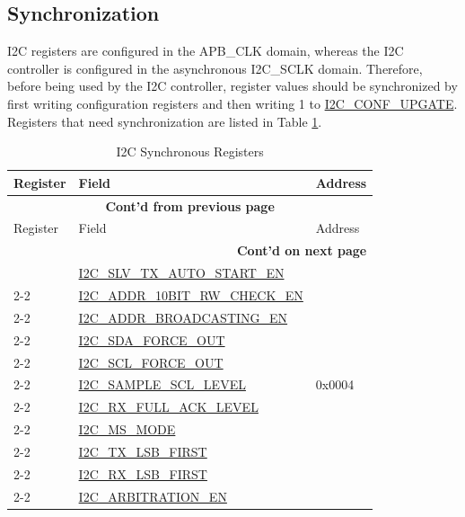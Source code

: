 \documentclass[main\_\_EN.tex]{subfiles}
\begin{document}
\subsection{Synchronization}
I2C registers are configured in the APB\_CLK domain, whereas the I2C controller is configured in the asynchronous I2C\_SCLK domain. Therefore, before being used by the I2C controller, register values should be synchronized by first writing configuration registers and then writing 1 to \hyperref[fielddesc:I2CCONFUPGATE]{I2C\_CONF\_UPGATE}. Registers that need synchronization are listed in Table \ref{tab:i2c-sync-register}. 

\newpage
\begin{longtable}{ | p{6cm} | p{7cm} | p{2cm} | }
\caption{I2C Synchronous Registers}
\label{tab:i2c-sync-register}
\\\hline
\rowcolor{lightgray}
\textbf{Register} & \textbf{Field} & \textbf{Address}  \\ \hline
\endfirsthead
    
\multicolumn{3}{c}{\bfseries Cont'd from previous page}\\\hline
\rowcolor{lightgray}
Register & Field & Address  \\ \hline
\endhead

\multicolumn{3}{r}{\textbf{Cont'd on next page}} \\\hline
\endfoot
    
\endlastfoot

\multirow{11}{*}{\hyperref[regdesc:I2CCTRREG]{I2C\_CTR\_REG}} & {\hyperref[fielddesc:I2CSLVTXAUTOSTARTEN]{I2C\_SLV\_TX\_AUTO\_START\_EN}} & \multirow{11}{*}{0x0004}   \\\cline{2-2}

& {\hyperref[fielddesc:I2CADDR10BITRWCHECKEN]{I2C\_ADDR\_10BIT\_RW\_CHECK\_EN}}& \\\cline{2-2}
& {\hyperref[fielddesc:I2CADDRBROADCASTINGEN]{I2C\_ADDR\_BROADCASTING\_EN}}& \\\cline{2-2}
& {\hyperref[fielddesc:I2CSDAFORCEOUT]{I2C\_SDA\_FORCE\_OUT}}& \\\cline{2-2}
& {\hyperref[fielddesc:I2CSCLFORCEOUT]{I2C\_SCL\_FORCE\_OUT}}& \\\cline{2-2}
& {\hyperref[fielddesc:I2CSAMPLESCLLEVEL]{I2C\_SAMPLE\_SCL\_LEVEL}}& \\\cline{2-2}
& {\hyperref[fielddesc:I2CRXFULLACKLEVEL]{I2C\_RX\_FULL\_ACK\_LEVEL}}& \\\cline{2-2}
& {\hyperref[fielddesc:I2CMSMODE]{I2C\_MS\_MODE}}& \\\cline{2-2}
& {\hyperref[fielddesc:I2CTXLSBFIRST]{I2C\_TX\_LSB\_FIRST}}& \\\cline{2-2}
& {\hyperref[fielddesc:I2CRXLSBFIRST]{I2C\_RX\_LSB\_FIRST}}& \\\cline{2-2}
& {\hyperref[fielddesc:I2CARBITRATIONEN]{I2C\_ARBITRATION\_EN}}& \\ \hline


\end{longtable}
\end{document}
